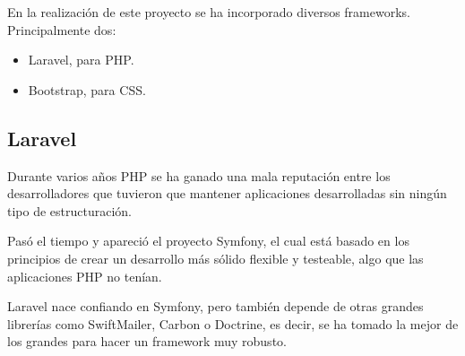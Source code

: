 En la realización de este proyecto se ha incorporado diversos frameworks. Principalmente dos:
\begin{itemize}
    \item Laravel, para PHP.
    \item Bootstrap, para CSS.
\end{itemize}

\subsection{Laravel}
Durante varios años PHP se ha ganado una mala reputación entre los desarrolladores que tuvieron que mantener aplicaciones desarrolladas sin ningún tipo de estructuración.

Pasó el tiempo y apareció el proyecto Symfony, el cual está basado en los principios de crear un desarrollo más sólido flexible y testeable, algo que las aplicaciones PHP no tenían.

Laravel nace confiando en Symfony, pero también depende de otras grandes librerías como SwiftMailer, Carbon o Doctrine, es decir, se ha tomado la mejor de los grandes para hacer un framework muy robusto.

